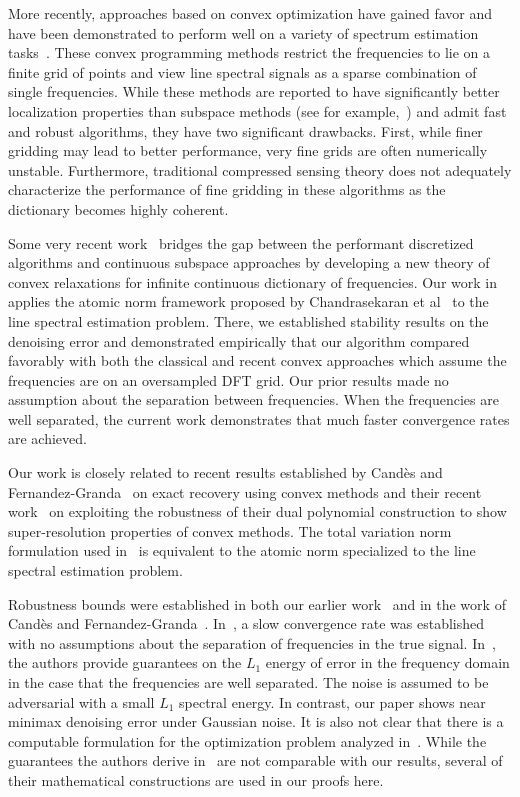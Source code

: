 More recently, approaches based on convex optimization have gained favor and
have been demonstrated to perform well on a variety of spectrum estimation
tasks~\cite{malioutov05,bourguignon2007irregular,baraniuk2010model,zweig2003irregular}. These convex programming methods restrict the frequencies to lie on a
finite grid of points and view line spectral signals as a sparse combination of
single frequencies. While these methods are reported to have significantly
better localization properties than subspace methods (see for
example,~\cite{malioutov05}) and admit fast and robust algorithms, they have
two significant drawbacks. First, while finer gridding may lead to better
performance, very fine grids are often numerically unstable. Furthermore,
traditional compressed sensing theory does not adequately characterize the
performance of fine gridding in these algorithms as the dictionary becomes
highly coherent.

Some very recent work~\cite{btr12,cg_exact12,cg_noisy} bridges the gap between
the performant discretized algorithms and continuous subspace approaches by
developing a new theory of convex relaxations for infinite continuous
dictionary of frequencies. Our work in~\cite{btr12} applies the atomic norm
framework proposed by Chandrasekaran et al~\cite{crpw} to the line spectral
estimation problem. There, we established stability results on the denoising
error and demonstrated empirically that our algorithm compared favorably with
both the classical and recent convex approaches which assume the frequencies
are on an oversampled DFT grid. Our prior results made no assumption about the
separation between frequencies. When the frequencies are well separated, the
current work demonstrates that much faster convergence rates are achieved.

Our work is closely related to recent results established by Cand\`es and
Fernandez-Granda~\cite{cg_exact12} on exact recovery using convex methods and
their recent work~\cite{cg_noisy} on exploiting the robustness of their dual
polynomial construction to show super-resolution properties of convex methods.
The total variation norm formulation used in~\cite{cg_noisy} is equivalent to
the atomic norm specialized to the line spectral estimation problem.

Robustness bounds were established in both our earlier work~\cite{btr12} and in
the work of Cand\`es and Fernandez-Granda~\cite{cg_noisy}. In~\cite{btr12}, a
slow convergence rate was established with no assumptions about the separation
of frequencies in the true signal. In~\cite{cg_noisy}, the authors provide
guarantees on the $L_1$ energy of error in the frequency domain in the case
that the frequencies are well separated. The noise is assumed to be adversarial
with a small $L_1$ spectral energy. In contrast, our paper shows near minimax
denoising error under Gaussian noise. It is also not clear that there is a
computable formulation for the optimization problem analyzed
in~\cite{cg_noisy}. While the guarantees the authors derive in~\cite{cg_noisy}
are not comparable with our results, several of their mathematical
constructions are used in our proofs here.

